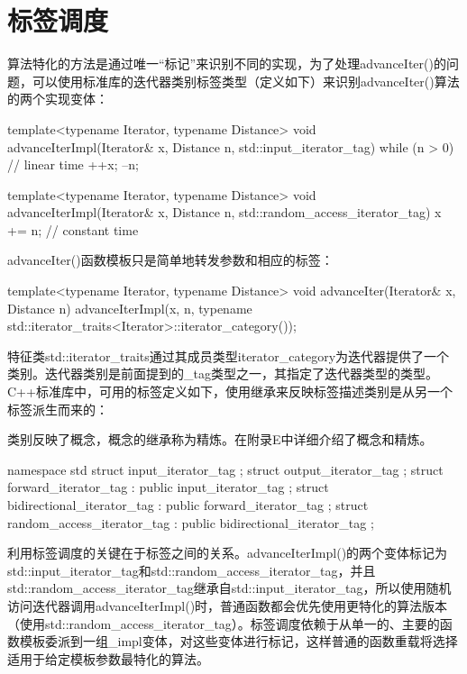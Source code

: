 \section{标签调度}

算法特化的方法是通过唯一“标记”来识别不同的实现，为了处理advanceIter()的问题，可以使用标准库的迭代器类别标签类型（定义如下）来识别advanceIter()算法的两个实现变体：

\begin{cpp}
template<typename Iterator, typename Distance>
void advanceIterImpl(Iterator& x, Distance n, std::input_iterator_tag)
{
	while (n > 0) { // linear time
		++x;
		--n;
	}
}

template<typename Iterator, typename Distance>
void advanceIterImpl(Iterator& x, Distance n,
					std::random_access_iterator_tag) {
	x += n; // constant time
}
\end{cpp}

advanceIter()函数模板只是简单地转发参数和相应的标签：

\begin{cpp}
template<typename Iterator, typename Distance>
void advanceIter(Iterator& x, Distance n)
{
	advanceIterImpl(x, n,
				typename
						std::iterator_traits<Iterator>::iterator_category());
}
\end{cpp}

特征类std::iterator\_traits通过其成员类型iterator\_category为迭代器提供了一个类别。迭代器类别是前面提到的\_tag类型之一，其指定了迭代器类型的类型。C++标准库中，可用的标签定义如下，使用继承来反映标签描述类别是从另一个标签派生而来的：

\begin{notice}
类别反映了概念，概念的继承称为精炼。在附录E中详细介绍了概念和精炼。
\end{notice}

\begin{cpp}
namespace std {
	struct input_iterator_tag { };
	struct output_iterator_tag { };
	struct forward_iterator_tag : public input_iterator_tag { };
	struct bidirectional_iterator_tag : public forward_iterator_tag { };
	struct random_access_iterator_tag : public bidirectional_iterator_tag { };
}
\end{cpp}

利用标签调度的关键在于标签之间的关系。advanceIterImpl()的两个变体标记为std::input\_iterator\_tag和std::random\_access\_iterator\_tag，并且std::random\_access\_iterator\_tag继承自std::input\_iterator\_tag，所以使用随机访问迭代器调用advanceIterImpl()时，普通函数都会优先使用更特化的算法版本（使用std::random\_access\_iterator\_tag）。标签调度依赖于从单一的、主要的函数模板委派到一组\_impl变体，对这些变体进行标记，这样普通的函数重载将选择适用于给定模板参数最特化的算法。

